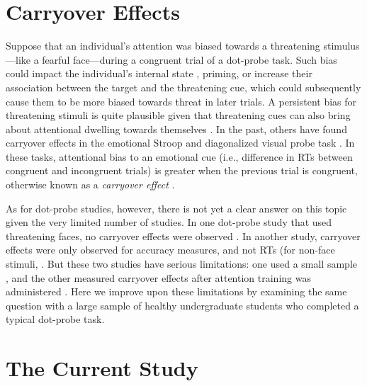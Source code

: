 \documentclass{article}
\begin{document}
	\section{Carryover Effects}



	Suppose that an individual’s attention was biased towards a threatening stimulus—like a fearful face—during a congruent trial of a dot-probe task. Such bias could impact the {\color{4472C4}individual’s internal state }\textcite{[object Object]}, priming,{\color{4472C4} or increase their association between the target and the threatening cue, which could subsequently cause }them to be more biased towards threat in later trials. A persistent bias for threatening stimuli is quite plausible given that threatening cues can also bring about attentional dwelling towards themselves \textcite{[object Object], [object Object]}. In the past, others have found carryover effects in the emotional Stroop \textcite{[object Object], [object Object], [object Object], [object Object]} and diagonalized visual probe task \textcite{[object Object], [object Object], [object Object]}. In these tasks, attentional bias to an emotional cue (i.e., difference in RTs between congruent and incongruent trials) is greater when the previous trial is congruent, otherwise known as a \emph{carryover effect }\textcite{[object Object]}.



	As for dot-probe studies,{\color{4472C4} however, there is not yet a clear answer on this topic given the very limited number of studies. }In one dot-probe study that used threatening faces, no carryover effects were observed \textcite{[object Object]}. In another study, carryover effects were only observed for accuracy measures, and not RTs (for non-face stimuli, \textcite{[object Object]}. But these two studies have serious limitations: one used a small sample \textcite{[object Object]}, and the other measured carryover effects after attention training was administered \textcite{[object Object]}. Here we improve upon these limitations by examining the same question with a large sample of healthy undergraduate students who completed a typical dot-probe task.



	\section{The Current Study}
\end{document}
